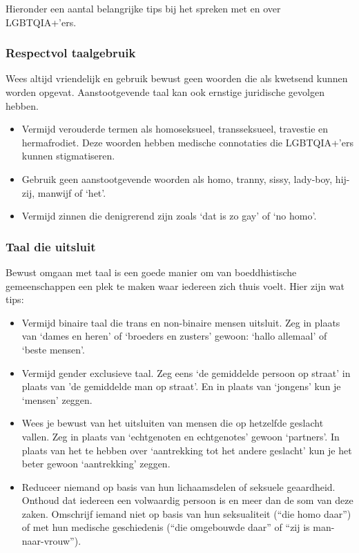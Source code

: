 \documentclass[12pt,openany]{book}
\begin{document}
Hieronder een aantal belangrijke tips bij het spreken met en over LGBTQIA+’ers.

\subsubsection*{Respectvol taalgebruik}

Wees altijd vriendelijk en gebruik bewust geen woorden die als kwetsend kunnen worden opgevat. Aanstootgevende taal kan ook ernstige juridische gevolgen hebben.

\begin{itemize}
  \setlength\itemsep{0em}
  \item Vermijd verouderde termen als homoseksueel, transseksueel, travestie en hermafrodiet. Deze woorden hebben medische connotaties die LGBTQIA+’ers kunnen stigmatiseren.
  \item Gebruik geen aanstootgevende woorden als homo, tranny, sissy, lady-boy, hij-zij, manwijf of ‘het’.
  \item Vermijd zinnen die denigrerend zijn zoals ‘dat is zo gay’ of ‘no homo’.
\end{itemize}

\subsubsection*{Taal die uitsluit}

Bewust omgaan met taal is een goede manier om van boeddhistische gemeenschappen een plek te maken waar iedereen zich thuis voelt.  Hier zijn wat tips:

\begin{itemize}
  \setlength\itemsep{0em}
  \item Vermijd binaire taal die trans en non-binaire mensen uitsluit. Zeg in plaats van ‘dames en heren’ of ‘broeders en zusters’ gewoon: ‘hallo allemaal’ of ‘beste mensen’.
  \item Vermijd gender exclusieve taal. Zeg eens ‘de gemiddelde persoon op straat’ in plaats van ’de gemiddelde man op straat’. En in plaats van ‘jongens’ kun je ‘mensen’ zeggen.
  \item Wees je bewust van het uitsluiten van mensen die op hetzelfde geslacht vallen. Zeg in plaats van ‘echtgenoten en echtgenotes’ gewoon ‘partners’. In plaats van het te hebben over ‘aantrekking tot het andere geslacht’ kun je het beter gewoon ‘aantrekking’ zeggen.
\item Reduceer niemand op basis van hun lichaamsdelen of seksuele geaardheid. Onthoud dat iedereen een volwaardig persoon is en meer dan de som van deze zaken. Omschrijf iemand niet op basis van hun seksualiteit (“die homo daar”) of met hun medische geschiedenis (“die omgebouwde daar” of “zij is man-naar-vrouw”).
\end{itemize}
\end{document}
